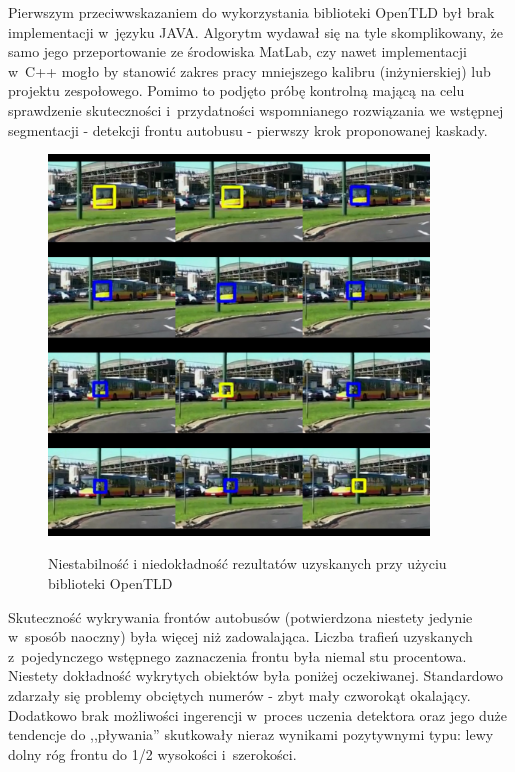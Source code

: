 Pierwszym przeciwwskazaniem do wykorzystania biblioteki OpenTLD 
był brak implementacji w~języku JAVA. Algorytm wydawał się na tyle
skomplikowany, że samo jego przeportowanie ze środowiska MatLab,
czy nawet implementacji w~C++ mogło by stanowić zakres pracy
mniejszego kalibru (inżynierskiej) lub projektu zespołowego.
Pomimo to podjęto próbę kontrolną mającą na celu sprawdzenie
skuteczności i~przydatności wspomnianego rozwiązania we wstępnej 
segmentacji - detekcji frontu autobusu - 
pierwszy krok proponowanej kaskady.

\begin{figure}[h!]
    \caption{Niestabilność i niedokładność rezultatów uzyskanych przy
    użyciu biblioteki OpenTLD}
    \centering
    \includegraphics[width=0.9\textwidth]{img/exp_open_tld_fail}
    \label{fig:opentld_bus_front_fail}
\end{figure}

Skuteczność wykrywania frontów autobusów (potwierdzona 
niestety jedynie w~sposób naoczny) była więcej niż zadowalająca.
Liczba trafień uzyskanych z~pojedynczego wstępnego zaznaczenia frontu
była niemal stu procentowa. Niestety dokładność wykrytych obiektów
była poniżej oczekiwanej. Standardowo zdarzały się problemy
obciętych numerów - zbyt mały czworokąt okalający. Dodatkowo
brak możliwości ingerencji w~proces uczenia detektora oraz jego
duże tendencje do ,,pływania'' skutkowały nieraz wynikami pozytywnymi
typu: lewy dolny róg frontu do 1/2 wysokości i~szerokości. 

